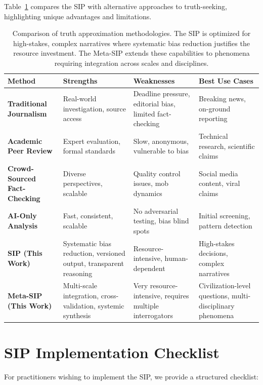 \documentclass[11pt,a4paper]{article}
\begin{document}
\begin{small}
Table~\ref{tab:methods} compares the SIP with alternative approaches to truth-seeking, highlighting unique advantages and limitations.

\begin{table}[ht]
\centering
\small
\begin{tabular}{@{}p{3cm}p{3.5cm}p{3.5cm}p{3cm}@{}}
\toprule
\textbf{Method} & \textbf{Strengths} & \textbf{Weaknesses} & \textbf{Best Use Cases} \\
\midrule
\textbf{Traditional Journalism} & Real-world investigation, source access & Deadline pressure, editorial bias, limited fact-checking & Breaking news, on-ground reporting \\
\addlinespace
\textbf{Academic Peer Review} & Expert evaluation, formal standards & Slow, anonymous, vulnerable to bias & Technical research, scientific claims \\
\addlinespace
\textbf{Crowd-Sourced Fact-Checking} & Diverse perspectives, scalable & Quality control issues, mob dynamics & Social media content, viral claims \\
\addlinespace
\textbf{AI-Only Analysis} & Fast, consistent, scalable & No adversarial testing, bias blind spots & Initial screening, pattern detection \\
\addlinespace
\textbf{SIP (This Work)} & Systematic bias reduction, versioned output, transparent reasoning & Resource-intensive, human-dependent & High-stakes decisions, complex narratives \\
\addlinespace
\textbf{Meta-SIP (This Work)} & Multi-scale integration, cross-validation, systemic synthesis & Very resource-intensive, requires multiple interrogators & Civilization-level questions, multi-disciplinary phenomena \\
\bottomrule
\end{tabular}
\caption{Comparison of truth approximation methodologies. The SIP is optimized for high-stakes, complex narratives where systematic bias reduction justifies the resource investment. The Meta-SIP extends these capabilities to phenomena requiring integration across scales and disciplines.}
\label{tab:methods}
\end{table}

\section{SIP Implementation Checklist}
\label{app:checklist}

For practitioners wishing to implement the SIP, we provide a structured checklist:


\end{small}
\end{document}
